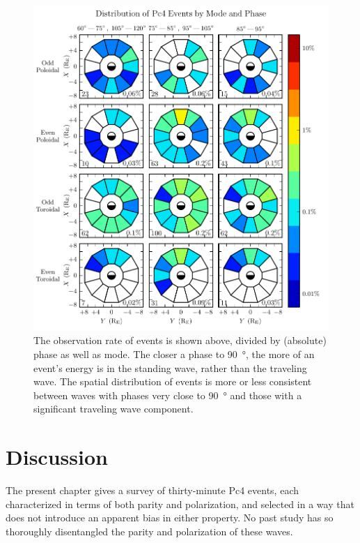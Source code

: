 \begin{figure}[!htb]
  \centering
  \includegraphics[width=\textwidth]{figures/mode_phase.pdf}
  \caption[Rate of Pc4 Events by Mode and Phase]{
    The observation rate of events is shown above, divided by (absolute) phase
    as well as mode. The closer a phase to \SI{90}{\degree}, the more of an
    event's energy is in the standing wave, rather than the traveling wave. The
    spatial distribution of events is more or less consistent between waves
    with phases very close to \SI{90}{\degree} and those with a significant
    traveling wave component. 
  }
  \label{fig_mode_phase}
\end{figure}

\section{Discussion}

The present chapter gives a survey of  thirty-minute Pc4 events, each
characterized in terms of both parity and polarization, and selected in a way
that does not introduce an apparent bias in either property. No past study has
so thoroughly disentangled the parity and polarization of these waves.

